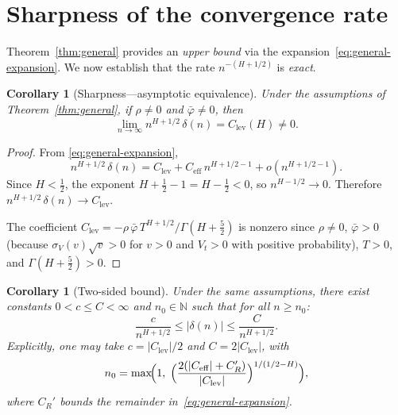 \documentclass[12pt]{article}
\newtheorem{corollary}[theorem]{Corollary}
\theoremstyle{definition}
\newcommand{\N}{\mathbb{N}}
\begin{document}
\section{Sharpness of the convergence rate}\label{sec:sharpness}

Theorem~\ref{thm:general} provides an \emph{upper bound} via the
expansion~\eqref{eq:general-expansion}.
We now establish that the rate $n^{-(H+1/2)}$ is \emph{exact}.

\begin{corollary}[Sharpness---asymptotic equivalence]
\label{cor:sharpness}
Under the assumptions of Theorem~\ref{thm:general},
if $\rho \neq 0$ and $\bar\varphi \neq 0$, then
\begin{equation}\label{eq:sharpness}
  \lim_{n\to\infty} n^{H+1/2}\,\delta(n) = C_{\mathrm{lev}}(H)
  \neq 0.
\end{equation}
\end{corollary}

\begin{proof}
From \eqref{eq:general-expansion},
\[
  n^{H+1/2}\,\delta(n)
  = C_{\mathrm{lev}}
  + C_{\mathrm{eff}}\,n^{H+1/2-1}
  + o(n^{H+1/2-1}).
\]
Since $H < \tfrac12$, the exponent $H + \tfrac12 - 1 = H - \tfrac12 < 0$,
so $n^{H-1/2} \to 0$.
Therefore $n^{H+1/2}\,\delta(n) \to C_{\mathrm{lev}}$.

The coefficient
$C_{\mathrm{lev}} = -\rho\,\bar\varphi\,T^{H+1/2}/\Gamma(H+\tfrac52)$
is nonzero since $\rho \neq 0$, $\bar\varphi > 0$
(because $\sigma_V(v)\sqrt{v} > 0$ for $v > 0$ and $V_t > 0$
with positive probability), $T > 0$, and
$\Gamma(H+\tfrac52) > 0$.
\end{proof}

\begin{corollary}[Two-sided bound]\label{cor:two-sided}
Under the same assumptions, there exist constants
$0 < c \le C < \infty$ and $n_0 \in \N$ such that for all
$n \ge n_0$:
\begin{equation}\label{eq:two-sided}
  \frac{c}{n^{H+1/2}}
  \le |\delta(n)|
  \le \frac{C}{n^{H+1/2}}.
\end{equation}
Explicitly, one may take $c = |C_{\mathrm{lev}}|/2$ and
$C = 2|C_{\mathrm{lev}}|$, with
\begin{equation}\label{eq:n0-explicit}
  n_0 = \max\!\Bigl(1,\;
  \Bigl(\frac{2(|C_{\mathrm{eff}}| + C_R')}
  {|C_{\mathrm{lev}}|}\Bigr)^{1/(1/2-H)}\Bigr),
\end{equation}
where $C_R'$ bounds the remainder in~\eqref{eq:general-expansion}.
\end{corollary}
\end{document}
